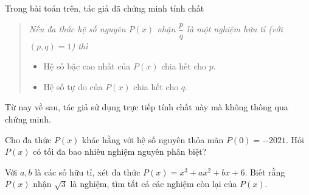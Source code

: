 \begin{luuy}
Trong bài toán trên, tác giả đã chứng minh tính chất
\begin{quote}
\it
     Nếu đa thức hệ số nguyên $P(x)$ nhận $\dfrac{p}{q}$ là một nghiệm hữu tỉ (với $(p,q)=1$) thì
\begin{itemize}
    \item Hệ số bậc cao nhất của $P(x)$ chia hết cho $p.$
    \item Hệ số tự do của $P(x)$ chia hết cho $q.$
\end{itemize}
\end{quote}
Từ nay về sau, tác giả sử dụng trực tiếp tính chất này mà không thông qua chứng minh.
\end{luuy}

\begin{bx}
Cho đa thức $P(x)$ khác hằng với hệ số nguyên thỏa mãn $P(0)=-2021.$ Hỏi $P(x)$ có tối đa bao nhiêu nghiệm nguyên phân biệt?
\end{bx}

\begin{bx}
Với $a,b$ là các số hữu tỉ, xét đa thức $P(x)=x^3+ax^2+bx+6.$ Biết rằng $P(x)$ nhận $\sqrt{3}$ là nghiệm, tìm tất cả các nghiệm còn lại của $P(x).$
\end{bx}

